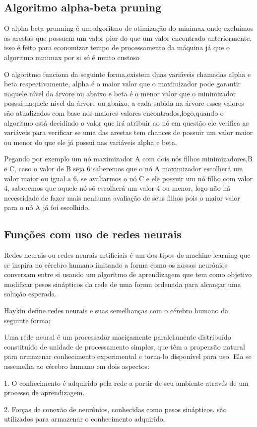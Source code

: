 \subsection{Algoritmo alpha-beta pruning}

O alpha-beta prunning é um algoritmo de otimização do minimax onde excluímos as arestas que possuem um valor
pior do que um valor encontrado anteriormente, isso é feito para economizar tempo de processamento da máquina
já que o algoritmo minimax por si só é muito custoso


O algoritmo funciona da seguinte forma,existem duas variáveis chamadas alpha e beta respectivamente,
alpha é o maior valor que o maximizador pode garantir naquele nível da árvore ou abaixo e beta é o menor
valor que o minimizador possui naquele nível da árvore ou abaixo, a cada subida na árvore esses valores são
atualizados com base nos maiores valores encontrados,logo,quando o algoritmo está decidindo o valor que irá
atribuir ao nó em questão ele verifica as variáveis para verificar se uma das arestas tem chances de possuir
um valor maior ou menor do que ele já possui nas variáveis alpha e beta.


Pegando por exemplo um nó maximizador A com dois nós filhos minimizadores,B e C,
caso o valor de B seja 6 saberemos que o nó A maximizador escolherá um valor maior ou igual a 6,
se avaliarmos o nó C e ele possuir um nó filho com valor 4, saberemos que aquele nó só escolherá um valor 4
ou menor, logo não há necessidade de fazer mais nenhuma avaliação de seus filhos pois o maior valor para o nó
A já foi escolhido.

\subsection{Funções com uso de redes neurais}

Redes neurais ou redes neurais artificiais é um dos tipos de machine learning que se inspira no cérebro
humano imitando a forma como os nossos neurônios conversam entre si usando um algoritmo de aprendizagem
que tem como objetivo modificar pesos sinápticos da rede de uma forma ordenada para alcançar uma solução esperada.

Haykin define redes neurais e suas semelhanças com o cérebro humano da seguinte forma:

\begin{citacao}
    Uma rede neural é um processador maciçamente paralelamente distribuído constituído de unidade de processamento simples,
    que têm a propensão natural para armazenar conhecimento experimental e torna-lo disponível para uso. Ela se assemelha ao cérebro humano
    em dois aspectos:

    1. O conhecimento é adquirido pela rede a partir de seu ambiente através de um processo de aprendizagem.

    2. Forças de conexão de neurônios, conhecidas como pesos sinápticos, são utilizados para armazenar o conhecimento adquirido.
    \cite{HAYKIN}
\end{citacao}

